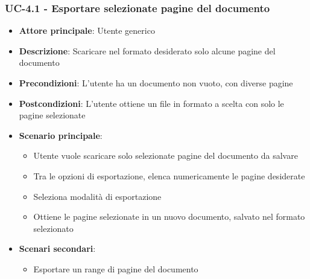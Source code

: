 \documentclass[11pt,a4paper]{article}
\begin{document}
\subsubsection{UC-4.1 - Esportare selezionate pagine del documento}
\begin{itemize}
    \item \textbf{Attore principale}: Utente generico
    \item \textbf{Descrizione}: Scaricare nel formato desiderato solo alcune pagine del documento
    \item \textbf{Precondizioni}: L'utente ha un documento non vuoto, con diverse pagine
    \item \textbf{Postcondizioni}: L'utente ottiene un file in formato a scelta con solo le pagine selezionate
    \item \textbf{Scenario principale}:
        \begin{itemize}
            \item Utente vuole scaricare solo selezionate pagine del documento da salvare
            \item Tra le opzioni di esportazione, elenca numericamente le pagine desiderate
            \item Seleziona modalità di esportazione
            \item Ottiene le pagine selezionate in un nuovo documento, salvato nel formato selezionato
        \end{itemize}
    \item \textbf{Scenari secondari}:
        \begin{itemize}
            \item Esportare un range di pagine del documento
        \end{itemize}
\end{itemize}
\end{document}
